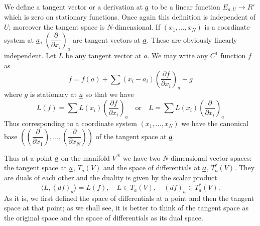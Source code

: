 We define a tangent vector or a derivation at $\underline{a}$ to be a linear
function $E_{a,U}\to R'$ which is zero on stationary functions. Once
again this definition is independent of $U$; moreover the tangent
space is $N$-dimensional. If $(x_{1},\ldots,x_{N})$ is a coordinate
system at $\underline{a}$, $\left(\dfrac{\partial}{\partial
  x_{i}}\right)_{a}$ are tangent vectors at $\underline{a}$. These are
obviously linearly independent. Let $L$ be any tangent vector at
$a$. We may write any $C^{1}$ function $f$ as
$$
f=f(a)+\sum(x_{i}-a_{i})\left(\dfrac{\partial f}{\partial
  x_{i}}\right)_{a}+g 
$$
where $g$ is stationary at $\underline{a}$ so that we have
$$
L(f)=\sum L(x_{i})\left(\dfrac{\partial f}{\partial
  x_{i}}\right)_{a}\quad\text{or}\quad
L=\sum L(x_{i})\left(\dfrac{\partial}{\partial x_{i}}\right)_{a} 
$$
Thus corresponding to a coordinate system $(x_{1},\ldots,x_{N})$ we
have the canonical base $\left(\left(\dfrac{\partial}{\partial
  x_{1}}\right),\ldots,\left(\dfrac{\partial}{\partial
  x_{N}}\right)\right)$ of the tangent space at $\underline{a}$.

Thus at a point $\underline{a}$ on the manifold $V^{N}$ we have two
$N$-dimensional vector spaces: the tangent space at $\underline{a}$,
$T_{a}(V)$ and the space of differentials at $\underline{a}$,
$T^{\ast}_{a}(V)$. They are duals of each other and the\pageoriginale
duality is given by the scalar product
$$
\langle L,(df)_{a}\rangle=L(f),\quad L\in T_{a}(V),\quad (df)_{a}\in
T^{\ast}_{a}(V).
$$
As it is, we first defined the space of differentials at a point and
then the tangent space at that point; as we shall see, it is better to
think of the tangent space as the original space and the space of
differentials as its dual space.



